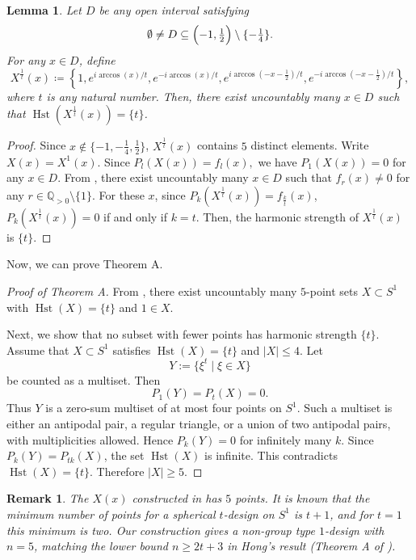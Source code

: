 \documentclass{amsart}
\newtheorem{lem}[thm]{Lemma}
\newtheorem{rem}[thm]{Remark}
\theoremstyle{definition}
\DeclareMathOperator{\Hst}{Hst}
\begin{document}
\begin{lem}\label{lem:singleton2}
  Let $D$ be any open interval satisfying
    \[\emptyset\neq D\subseteq\Bigl(-1,\tfrac12\Bigr)\setminus\{-\tfrac14\}.\]
  For any $x\in D$, define
\[
    X^{\frac{1}{t}}(x)\coloneqq 
\left\{1,e^{{i\arccos(x)}/{t}},e^{-{i\arccos(x)}/{t}},
e^{i\arccos\left(-x-\tfrac12\right)/t},
e^{-i\arccos\left(-x-\tfrac12\right)/t}
\right\},
\]
where $t$ is any natural number.
  Then, there exist uncountably many $x\in D$ such that $\Hst(X^{\frac{1}{t}}(x))=\{t\}$.
\end{lem}

\begin{proof}
      Since $x\notin\{-1,-\tfrac14,\tfrac12\}$, $X^{\tfrac1t}(x)$ contains $5$ distinct elements.
      Write $X(x)=X^1(x)$.
  Since
  \( P_l(X(x))=f_l(x), \)
  we have $P_1(X(x))=0$ for any $x \in D$. 
  From , there exist uncountably many $x \in D$ such that
$f_r(x)\neq0$ for any $r\in\mathbb{Q}_{>0}\setminus\{1\}$.
For these $x$, since $P_k(X^{\frac{1}{t}}(x))=f_{\frac{k}{t}}(x)$, $P_k(X^{\tfrac1t}(x))=0$ if and only if $k=t$. %
Then, the harmonic strength of $X^{\frac{1}{t}}(x)$ is $\{t\}$.
\end{proof}

Now, we can prove Theorem A.

\begin{proof}[Proof of Theorem A]
  From , there exist uncountably many \(5\)-point sets \(X\subset S^1\) with \(\Hst(X)=\{t\}\) and \(1\in X\).
  
 Next, we show that no subset with fewer points has harmonic strength \(\{t\}\). Assume that \(X\subset S^1\) satisfies \(\Hst(X)=\{t\}\) and \(|X|\le4\). Let
\[
Y:=\{\xi^t\mid \xi\in X\}
\]
be counted as a multiset. Then
\[
P_1(Y)=P_t(X)=0.
\]
Thus \(Y\) is a zero-sum multiset of at most four points on \(S^1\).
Such a multiset is either an antipodal pair, a regular triangle, or a
union of two antipodal pairs, with multiplicities allowed. Hence
\(P_k(Y)=0\) for infinitely many \(k\). Since \(P_k(Y)=P_{tk}(X)\), the
set \(\Hst(X)\) is infinite. This contradicts \(\Hst(X)=\{t\}\).
Therefore \(|X|\ge5\).
\end{proof}
  
\begin{rem}
  The $X(x)$ constructed in  has $5$ points. It is known that the minimum number of points for a spherical $t$-design on $S^1$ is $t+1$, and for $t=1$ this minimum is two. 
  Our construction gives a non-group type $1$-design with $n=5$, matching the lower bound $n\ge2t+3$ in Hong's result (Theorem A of \cite{Hong82}).
\end{rem}
\end{document}

